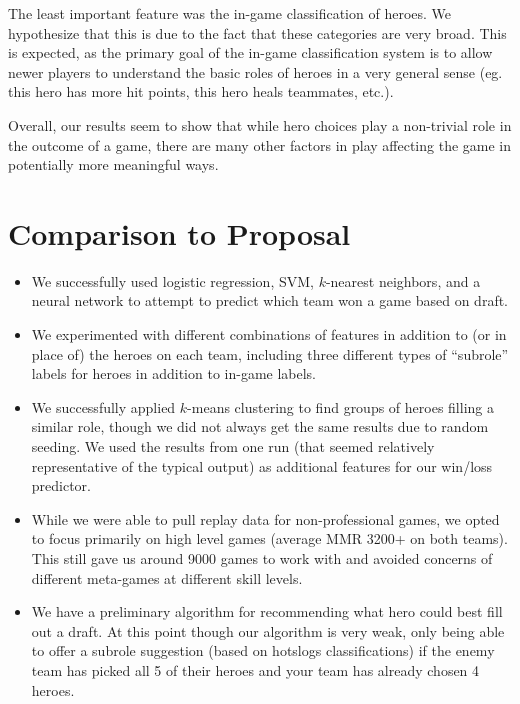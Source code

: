 \documentclass[11pt,letterpaper]{article}
\begin{document}
The least important feature was the in-game classification of heroes. We hypothesize that this is due to the fact that these categories are very broad. This is expected, as the primary goal of the in-game classification system is to allow newer players to understand the basic roles of heroes in a very general sense (eg. this hero has more hit points, this hero heals teammates, etc.).

Overall, our results seem to show that while hero choices play a non-trivial role in the outcome of a game, there are many other factors in play affecting the game in potentially more meaningful ways.



\section{Comparison to Proposal}
\begin{itemize}
\item We successfully used logistic regression, SVM, $k$-nearest neighbors, and a neural network to attempt to predict which team won a game based on draft.
\item We experimented with different combinations of features in addition to (or in place of) the heroes on each team, including three different types of ``subrole'' labels for heroes in addition to in-game labels.
\item We successfully applied $k$-means clustering to find groups of heroes filling a similar role, though we did not always get the same results due to random seeding. We used the results from one run (that seemed relatively representative of the typical output) as additional features for our win/loss predictor.
\item While we were able to pull replay data for non-professional games, we opted to focus primarily on high level games (average MMR 3200+ on both teams). This still gave us around 9000 games to work with and avoided concerns of different meta-games at different skill levels.
\item We have a preliminary algorithm for recommending what hero could best fill out a draft. At this point though our algorithm is very weak, only being able to offer a subrole suggestion (based on hotslogs classifications) if the enemy team has picked all 5 of their heroes and your team has already chosen 4 heroes.
\end{itemize}
%
\end{document}
